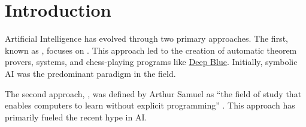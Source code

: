\chapter{Introduction}
Artificial Intelligence has evolved through two primary approaches. The first, known as , focuses on .  This approach led to the creation of automatic theorem provers,  systems, and chess-playing programs like \href{https://en.wikipedia.org/wiki/Deep_Blue_(chess_computer)}{Deep Blue}. Initially, symbolic AI was the predominant paradigm in the field.

The second approach, , was defined by Arthur Samuel as ``the field of study that enables
computers to learn without explicit programming'' \cite{samuel:1959}.  This
approach has primarily fueled the recent hype in AI. 

